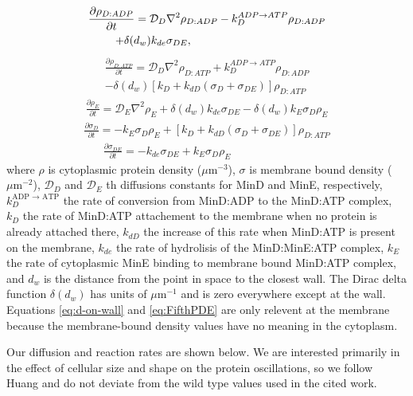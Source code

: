 \documentclass[letterpaper,twocolumn,amsmath,amssymb,pre]{revtex4-1}
\newcommand\micron{\ensuremath{\mu\text{m}}}
\begin{document}
\begin{multline}
  \frac{\partial \rho_{D:ADP}}{\partial t} = \mathcal{D}_D\nabla^2\rho_{D:ADP}-k_D^{ADP\rightarrow ATP}\rho_{D:ADP}\\
  +\delta(d_w)k_{de}\sigma_{DE},\hspace{3.4cm}
\end{multline}
\begin{multline}
  \frac{\partial \rho_{D:ATP}}{\partial t} = \mathcal{D}_D\nabla^2\rho_{D:ATP}+k_D^{ADP\rightarrow ATP}\rho_{D:ADP}\\
  -\delta(d_w)[k_D+k_{dD}(\sigma_D+\sigma_{DE})]\rho_{D:ATP}
\end{multline}
\begin{multline}
  \frac{\partial \rho_E}{\partial t} = \mathcal{D}_E\nabla^2\rho_E+\delta(d_w)k_{de}\sigma_{DE}
  -\delta(d_w)k_E \sigma_D \rho_E
\end{multline}
\begin{multline}
  \frac{\partial \sigma_D}{\partial t} = -k_E\sigma_D\rho_E
  +[k_D+k_{dD}(\sigma_D+\sigma_{DE})]\rho_{D:ATP}
  \label{eq:d-on-wall}
\end{multline}
\begin{multline}
  \frac{\partial \sigma_{DE}}{\partial t} = -k_{de}\sigma_{DE}+k_E\sigma_D\rho_E\hspace{3cm}
  \label{eq:FifthPDE}
\end{multline}
where $\rho$ is cytoplasmic protein density ($\micron^{-3}$), $\sigma$
is membrane bound density ($\micron^{-2}$), $\mathcal{D}_D$ and
$\mathcal{D}_{E}$ th diffusions constants for MinD and MinE,
respectively, $k_D^{\textrm{ADP $\rightarrow$ ATP}}$ the rate of
conversion from MinD:ADP to the MinD:ATP complex, $k_D$ the rate of
MinD:ATP attachement to the membrane when no protein is already
attached there, $k_{dD}$ the increase of this rate when MinD:ATP is
present on the membrane, $k_{de}$ the rate of hydrolisis of the
MinD:MinE:ATP complex, $k_E$ the rate of cytoplasmic MinE binding to
membrane bound MinD:ATP complex, and $d_w$ is the distance from the
point in space to the closest wall.  The Dirac delta function
$\delta(d_w)$ has units of $\micron^{-1}$ and is zero everywhere except
at the wall.  Equations \ref{eq:d-on-wall} and \ref{eq:FifthPDE} are
only relevent at the membrane because the membrane-bound density
values have no meaning in the cytoplasm.

Our diffusion and reaction rates are shown below.  We are interested
primarily in the effect of cellular size and shape on the protein
oscillations, so we follow Huang\cite{huang2003dynamic} and do not
deviate from the wild type values used in the cited work.
\end{document}
